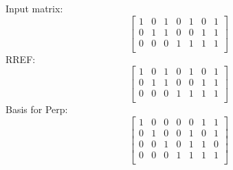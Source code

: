 \noindent Input matrix:
$$
\left[
\begin{array}{*{7}{c}}
1 & 0 & 1 & 0 & 1 & 0 & 1\\
0 & 1 & 1 & 0 & 0 & 1 & 1\\
0 & 0 & 0 & 1 & 1 & 1 & 1\\
\end{array}
\right]
$$
RREF:
$$
\left[
\begin{array}{*{7}{c}}
1 & 0 & 1 & 0 & 1 & 0 & 1\\
0 & 1 & 1 & 0 & 0 & 1 & 1\\
0 & 0 & 0 & 1 & 1 & 1 & 1\\
\end{array}
\right]
$$
Basis for Perp:
$$
\left[
\begin{array}{*{7}{c}}
1 & 0 & 0 & 0 & 0 & 1 & 1\\
0 & 1 & 0 & 0 & 1 & 0 & 1\\
0 & 0 & 1 & 0 & 1 & 1 & 0\\
0 & 0 & 0 & 1 & 1 & 1 & 1\\
\end{array}
\right]
$$
